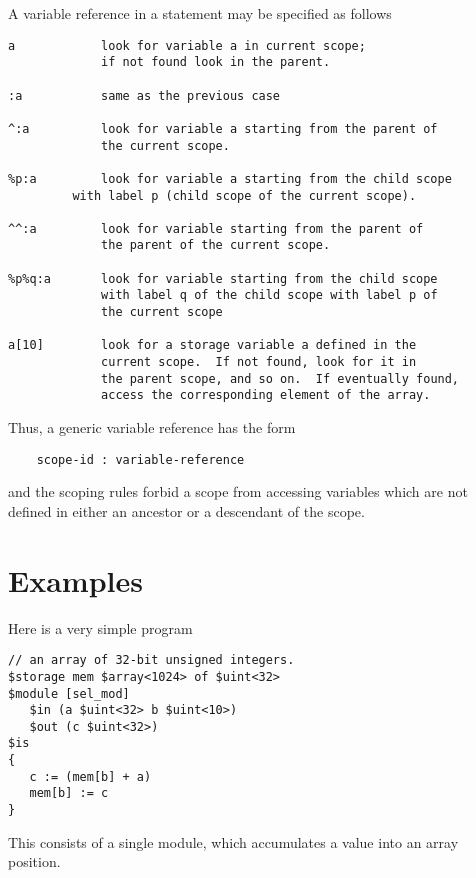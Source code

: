 \documentclass{article}
\begin{document}
A variable reference in a statement may be specified 
as follows
\begin{verbatim}
a            look for variable a in current scope; 
             if not found look in the parent.

:a           same as the previous case

^:a          look for variable a starting from the parent of
             the current scope.

%p:a         look for variable a starting from the child scope 
	     with label p (child scope of the current scope).

^^:a         look for variable starting from the parent of
             the parent of the current scope.

%p%q:a       look for variable starting from the child scope 
             with label q of the child scope with label p of 
             the current scope

a[10]        look for a storage variable a defined in the 
             current scope.  If not found, look for it in
             the parent scope, and so on.  If eventually found, 
             access the corresponding element of the array.
\end{verbatim}
Thus, a generic variable reference has the form 
\begin{verbatim} 
    scope-id : variable-reference 
\end{verbatim} 
and the scoping rules forbid a scope from accessing variables
which are not defined in either an ancestor or a descendant
of the scope.

\section{Examples}

Here is a very simple program
\begin{verbatim}
// an array of 32-bit unsigned integers.
$storage mem $array<1024> of $uint<32> 
$module [sel_mod]
   $in (a $uint<32> b $uint<10>)
   $out (c $uint<32>)
$is
{
   c := (mem[b] + a)
   mem[b] := c
}
\end{verbatim}
This consists of a single module, which accumulates
a value into an array position.
\end{document}
